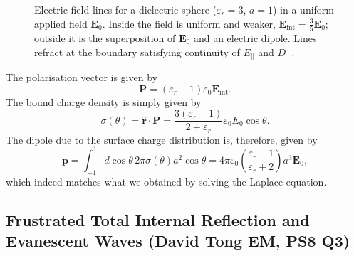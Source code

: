 \begin{figure}[htbp]
\caption{Electric field lines for a dielectric sphere ($\varepsilon_r=3$, $a=1$)
in a uniform applied field $\mathbf{E}_0$. Inside the field is uniform and
weaker, $\mathbf{E}_{\mathrm{int}}=\frac{3}{5}\mathbf{E}_0$; outside it is
the superposition of $\mathbf{E}_0$ and an electric dipole. Lines refract at
the boundary satisfying continuity of $E_\parallel$ and $D_\perp$.}
\label{fig:dielectric-fieldlines}
\end{figure}
The polarisation vector is given by
\begin{equation}
    \mathbf{P} = (\varepsilon_r-1)\varepsilon_0\mathbf{E}_\text{int}.
\end{equation}
The bound charge density is simply given by
\begin{equation}
    \sigma(\theta)= \hat{\mathbf{r}}\cdot\mathbf{P} = \frac{3(\varepsilon_r-1)}{2+\varepsilon_r}\varepsilon_0E_0\cos\theta.
\end{equation}
The dipole due to the surface charge distribution is, therefore, given by
\begin{equation}
    \mathbf{p} =  \int_{-1}^1 d\cos\theta\,2\pi\sigma(\theta)a^2\cos\theta = 4\pi\varepsilon_0\!\left(\frac{\varepsilon_r-1}{\varepsilon_r+2}\right)a^3\mathbf{E}_0,
\end{equation}
which indeed matches what we obtained by solving the Laplace equation.

\subsection{Frustrated Total Internal Reflection and Evanescent Waves  (David Tong EM, PS8 Q3)}
\label{sec:ftir}

